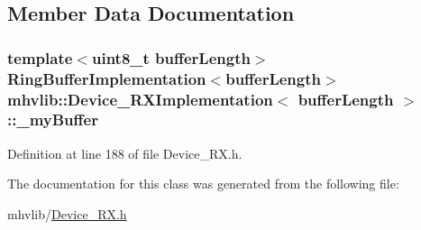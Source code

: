 \subsection{Member Data Documentation}
\hypertarget{classmhvlib_1_1_device___r_x_implementation_a6ea6a7a142d91f6b3cb4814313ef8abb}{
\subsubsection[{\-\_\-my\-Buffer}]{\setlength{\rightskip}{0pt plus 5cm}template$<$uint8\-\_\-t buffer\-Length$>$ {\bf Ring\-Buffer\-Implementation}$<$buffer\-Length$>$ {\bf mhvlib\-::\-Device\-\_\-\-R\-X\-Implementation}$<$ buffer\-Length $>$\-::\-\_\-my\-Buffer\hspace{0.3cm}{\ttfamily [protected]}}}\label{classmhvlib_1_1_device___r_x_implementation_a6ea6a7a142d91f6b3cb4814313ef8abb}


Definition at line 188 of file Device\-\_\-\-R\-X.\-h.



The documentation for this class was generated from the following file\-:\begin{DoxyCompactItemize}
\item 
mhvlib/\hyperlink{_device___r_x_8h}{Device\-\_\-\-R\-X.\-h}\end{DoxyCompactItemize}
